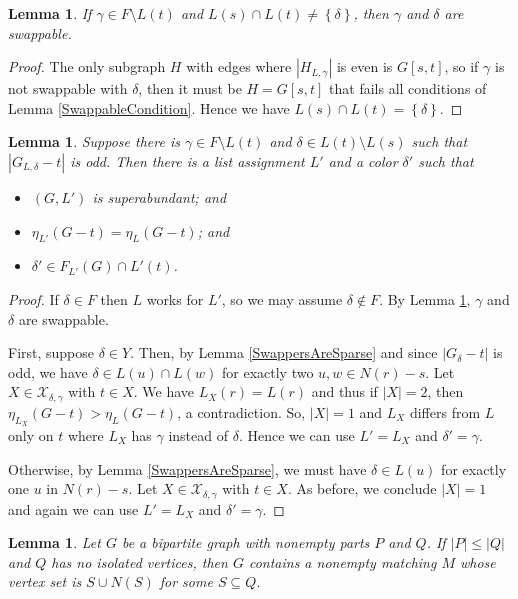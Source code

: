 \documentclass[12pt]{article}
\theoremstyle{plain}
\newtheorem{lem}[thm]{Lemma}
\theoremstyle{definition}
\theoremstyle{remark}
\newcommand{\fancy}[1]{\mathcal{#1}}
\newcommand{\set}[1]{\left\{ #1 \right\}}
\newcommand{\card}[1]{\left|#1\right|}
\def\X{\fancy{X}}
\begin{document}
	\begin{lem}\label{SingleGammaMuchSwappage}
		If $\gamma \in F \setminus L(t)$ and $L(s) \cap L(t) \ne \set{\delta}$, then $\gamma$ and $\delta$ are swappable.
	\end{lem}
	\begin{proof}
			The only subgraph $H$ with edges where $\card{H_{L, \gamma}}$ is even is $G[s, t]$, so if $\gamma$ is not swappable with $\delta$, then it must be $H = G[s, t]$ that fails all conditions of Lemma \ref{SwappableCondition}.  Hence we have $L(s) \cap L(t) = \set{\delta}$.
	\end{proof}
	
	\begin{lem}\label{Odd_delta}
		Suppose there is $\gamma \in F \setminus L(t)$ and $\delta \in L(t) \setminus L(s)$ such that $\card{G_{L, \delta} - t}$ is odd.  Then there is a list assignment $L'$ and a color $\delta'$ such that
		\begin{itemize}
			\item $(G, L')$ is superabundant; and
			\item $\eta_{L'}(G - t) = \eta_L(G-t)$; and
			\item $\delta' \in F_{L'}(G) \cap L'(t)$.
		\end{itemize}
	\end{lem}
	\begin{proof}
		If $\delta \in F$ then $L$ works for $L'$, so we may assume $\delta \not \in F$.  By Lemma \ref{SingleGammaMuchSwappage}, $\gamma$ and $\delta$ are swappable.
		
		First, suppose $\delta \in Y$. Then, by Lemma \ref{SwappersAreSparse} and since $\card{G_\delta - t}$ is odd, we have $\delta \in L(u) \cap L(w)$ for exactly two $u,w \in N(r) - s$.   Let $X \in \X_{\delta,\gamma}$ with $t \in X$.  We have $L_X(r) = L(r)$ and thus if $|X| = 2$, then $\eta_{L_X}(G - t) > \eta_L(G - t)$, a contradiction.  So, $|X| = 1$ and $L_X$ differs from $L$ only on $t$ where $L_X$ has $\gamma$ instead of $\delta$.  Hence we can use $L' = L_X$ and $\delta' = \gamma$.
		
		Otherwise, by Lemma \ref{SwappersAreSparse}, we must have $\delta \in L(u)$ for exactly one $u$ in $N(r) - s$.  Let $X \in \X_{\delta,\gamma}$ with $t \in X$. As before, we conclude $|X| = 1$ and again we can use $L' = L_X$ and $\delta' = \gamma$.
	\end{proof}
	
		
		\begin{lem}\label{SpannerSpecial}
			Let $G$ be a bipartite graph with nonempty parts $P$ and $Q$.  If $|P| \le |Q|$ and $Q$ has no isolated vertices, then $G$ contains a nonempty matching $M$ whose vertex set is $S \cup N(S)$ for some $S \subseteq Q$.
		\end{lem}
		
\end{document}
